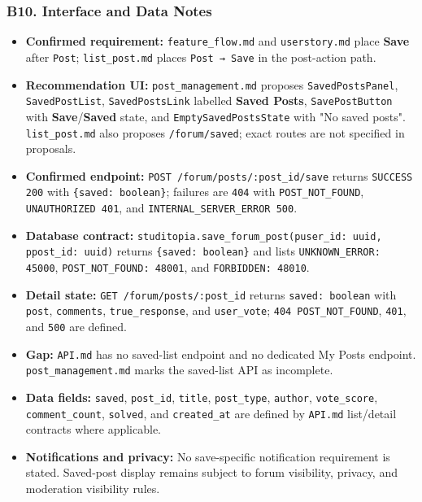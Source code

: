 \documentclass[12pt]{article}
\begin{document}
\hypertarget{sec:b10-interface-and-data-notes}{}
\subsubsection*{B10. Interface and Data Notes}
\par\medskip

\begin{itemize}
\item \textbf{Confirmed requirement:} \texttt{feature\_flow.md} and \texttt{userstory.md} place \textbf{Save} after \texttt{Post}; \texttt{list\_post.md} places \texttt{Post → Save} in the post-action path.
\item \textbf{Recommendation UI:} \texttt{post\_management.md} proposes \texttt{SavedPostsPanel}, \texttt{SavedPostList}, \texttt{SavedPostsLink} labelled \textbf{Saved Posts}, \texttt{SavePostButton} with \textbf{Save}/\textbf{Saved} state, and \texttt{EmptySavedPostsState} with "No saved posts". \texttt{list\_post.md} also proposes \texttt{/forum/saved}; exact routes are not specified in proposals.
\item \textbf{Confirmed endpoint:} \texttt{POST /forum/posts/:post\_id/save} returns \texttt{SUCCESS 200} with \texttt{\{saved: boolean\}}; failures are \texttt{404} with \texttt{POST\_NOT\_FOUND}, \texttt{UNAUTHORIZED 401}, and \texttt{INTERNAL\_SERVER\_ERROR 500}.
\item \textbf{Database contract:} \texttt{studitopia.save\_forum\_post(puser\_id: uuid, ppost\_id: uuid)} returns \texttt{\{saved: boolean\}} and lists \texttt{UNKNOWN\_ERROR: 45000}, \texttt{POST\_NOT\_FOUND: 48001}, and \texttt{FORBIDDEN: 48010}.
\item \textbf{Detail state:} \texttt{GET /forum/posts/:post\_id} returns \texttt{saved: boolean} with \texttt{post}, \texttt{comments}, \texttt{true\_response}, and \texttt{user\_vote}; \texttt{404 POST\_NOT\_FOUND}, \texttt{401}, and \texttt{500} are defined.
\item \textbf{Gap:} \texttt{API.md} has no saved-list endpoint and no dedicated My Posts endpoint. \texttt{post\_management.md} marks the saved-list API as incomplete.
\item \textbf{Data fields:} \texttt{saved}, \texttt{post\_id}, \texttt{title}, \texttt{post\_type}, \texttt{author}, \texttt{vote\_score}, \texttt{comment\_count}, \texttt{solved}, and \texttt{created\_at} are defined by \texttt{API.md} list/detail contracts where applicable.
\item \textbf{Notifications and privacy:} No save-specific notification requirement is stated. Saved-post display remains subject to forum visibility, privacy, and moderation visibility rules.
\end{itemize}
\par\medskip
\end{document}
